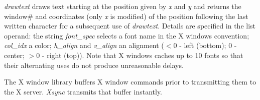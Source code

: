 \emph{drawtext} draws text starting at the position given by \emph{x} and \emph{y} and returns the window\# and coordinates (only \emph{x} is modified) of the position following the last written character for a subsequent use of \emph{drawtext}. Details are specified in the list operand: the string \emph{font\_spec} selects a font name in the X windows convention; \emph{col\_idx} a color; \emph{h\_align} and \emph{v\_align} an alignment ($<$0 - left (bottom); 0 - center; $>0$ - right (top)). Note that X windows caches up to 10 fonts so that their alternating uses do not produce unreasonable delays.
 
The X window library buffers X window commands prior to transmitting them to the X server. \emph{Xsync} transmits that buffer instantly.

